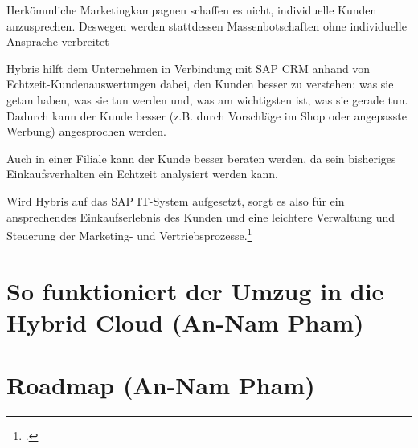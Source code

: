 Herkömmliche Marketingkampagnen schaffen es nicht, individuelle Kunden anzusprechen. Deswegen werden stattdessen Massenbotschaften ohne individuelle Ansprache verbreitet

Hybris hilft dem Unternehmen in Verbindung mit SAP CRM anhand von Echtzeit-Kundenauswertungen dabei, den Kunden besser zu verstehen: was sie getan haben, was sie tun werden und, was am wichtigsten ist, was sie gerade tun. Dadurch kann der Kunde besser (z.B. durch Vorschläge im Shop oder angepasste Werbung) angesprochen werden.

Auch in einer Filiale kann der Kunde besser beraten werden, da sein bisheriges Einkaufsverhalten ein Echtzeit analysiert werden kann.

Wird Hybris auf das SAP IT-System aufgesetzt, sorgt es also für ein ansprechendes Einkaufserlebnis des Kunden und eine leichtere Verwaltung und Steuerung der Marketing- und Vertriebsprozesse.\footcite[vgl.][]{Hybris}
\section{So funktioniert der Umzug in die Hybrid Cloud (An-Nam Pham)}
\section{Roadmap (An-Nam Pham)}
